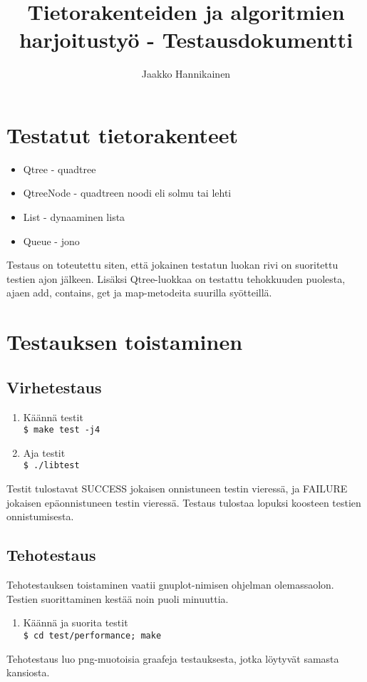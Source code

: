 \documentclass{article}
\author{Jaakko Hannikainen}
\title{Tietorakenteiden ja algoritmien harjoitustyö - Testausdokumentti}
\begin{document}
\maketitle

\section{Testatut tietorakenteet}
\begin{itemize}
    \item Qtree - quadtree
    \item QtreeNode - quadtreen noodi eli solmu tai lehti
    \item List - dynaaminen lista
    \item Queue - jono
\end{itemize}
Testaus on toteutettu siten, että jokainen testatun luokan rivi on suoritettu
testien ajon jälkeen. Lisäksi Qtree-luokkaa on testattu tehokkuuden puolesta,
ajaen add, contains, get ja map-metodeita suurilla syötteillä.

\section{Testauksen toistaminen}
\subsection{Virhetestaus}
\begin{enumerate}
    \item Käännä testit \\
        \texttt{\$ make test -j4} 
    \item Aja testit \\
        \texttt{\$ ./libtest}
\end{enumerate}
Testit tulostavat SUCCESS jokaisen onnistuneen testin vieressä, ja FAILURE
jokaisen epäonnistuneen testin vieressä. Testaus tulostaa lopuksi koosteen
testien onnistumisesta.

\subsection{Tehotestaus}
Tehotestauksen toistaminen vaatii gnuplot-nimisen ohjelman olemassaolon. Testien
suorittaminen kestää noin puoli minuuttia.
\begin{enumerate}
    \item Käännä ja suorita testit \\
        \texttt{\$ cd test/performance; make }
\end{enumerate}
Tehotestaus luo png-muotoisia graafeja testauksesta, jotka löytyvät samasta
kansiosta.
\end{document}

